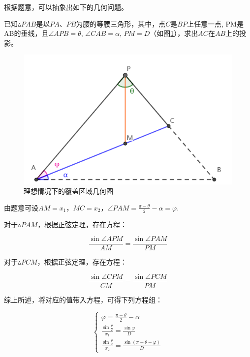 

根据题意，可以抽象出如下的几何问题。

已知$\vartriangle PAB$是以$PA$、$PB$为腰的等腰三角形，其中，点$C$是$BP$上任意一点, PM是AB的垂线，且$\angle APB = \theta$, $\angle CAB = \alpha$, $PM = D$（如图\ref{fig:理想情况下的覆盖区域几何图}），求出$AC$在$AB$上的投影。

\begin{figure}[h]
    \centering
    \includegraphics[scale=0.4]{res/img/理想情况下的覆盖区域几何图.png}
    \caption{理想情况下的覆盖区域几何图}
    \label{fig:理想情况下的覆盖区域几何图}
\end{figure}

由题意可设$AM=x_1$，$MC=x_2$，$\angle PAM = \frac{\pi - \theta}{2} - \alpha = \varphi $.

对于$\vartriangle PAM$，根据正弦定理，存在方程：

\begin{equation}
    \frac{\sin\angle APM}{AM} = \frac{\sin\angle PAM}{PM}
\end{equation}

对于$\vartriangle PCM$，根据正弦定理，存在方程：

\begin{equation}
    \frac{\sin\angle CPM}{CM} = \frac{\sin\angle PCM}{PM}
\end{equation}

综上所述，将对应的值带入方程，可得下列方程组：

\begin{equation}
    \begin{cases}
        \varphi = \frac{\pi - \theta}{2} - \alpha \\
        \frac{\sin \frac{\theta}{2}}{x_1} = \frac{\sin\varphi}{D} \\
        \frac{\sin \frac{\theta}{2}}{x_2} = \frac{\sin(\pi-\theta-\varphi)}{D}
    \end{cases}
\end{equation}

